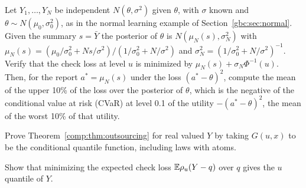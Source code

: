 \begin{exercises}
\item\label{ex:chgbc:3} Let $Y_1, \ldots, Y_N$ be independent $N(\theta, \sigma^2)$ given $\theta$, with $\sigma$ known and $\theta \sim N(\mu_0, \sigma_0^2)$, as in the normal learning example of Section~\ref{gbc:sec:normal}. Given the summary $s = \bar Y$ the posterior of $\theta$ is $N(\mu_N(s), \sigma_N^2)$ with $\mu_N(s) = (\mu_0/\sigma_0^2 + Ns/\sigma^2)/(1/\sigma_0^2 + N/\sigma^2)$ and $\sigma_N^2 = (1/\sigma_0^2 + N/\sigma^2)^{-1}$. Verify that the check loss at level $u$ is minimized by $\mu_N(s) + \sigma_N\Phi^{-1}(u)$. Then, for the report $a^\ast = \mu_N(s)$ under the loss $(a^\ast-\theta)^2$, compute the mean of the upper 10\% of the loss over the posterior of $\theta$, which is the negative of the conditional value at risk (CVaR) at level 0.1 of the utility $-(a^\ast-\theta)^2$, the mean of the worst 10\% of that utility.
\item\label{ex:ch08:1} Prove Theorem~\ref{comp:thm:outsourcing} for real valued $Y$ by taking $G(u,x)$ to be the conditional quantile function, including laws with atoms.
\item\label{ex:ch08:2} Show that minimizing the expected check loss $\mathbb{E}\rho_u(Y - q)$ over $q$ gives the $u$ quantile of $Y$.

\end{exercises}

